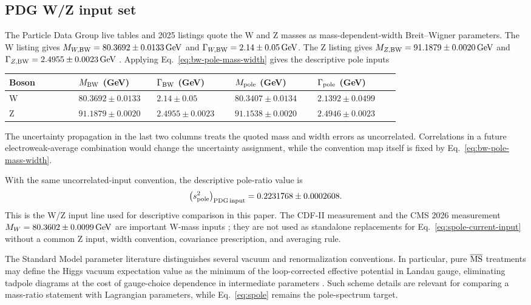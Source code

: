 \subsection{PDG W/Z input set}
\label{sec:current-wz-input}

The Particle Data Group live tables and 2025 listings quote the W and Z masses
as mass-dependent-width Breit--Wigner parameters.  The W listing gives
\(M_{W,\rm BW}=80.3692\pm0.0133\,{\rm GeV}\) and
\(\Gamma_{W,\rm BW}=2.14\pm0.05\,{\rm GeV}\).  The Z listing gives
\(M_{Z,\rm BW}=91.1879\pm0.0020\,{\rm GeV}\) and
\(\Gamma_{Z,\rm BW}=2.4955\pm0.0023\,{\rm GeV}\)
\cite{PDGWListing2025,PDGZListing2025}.  Applying
Eq.~\eqref{eq:bw-pole-mass-width} gives the descriptive pole inputs
\begin{center}
\small
\begin{tabular}{p{0.16\linewidth}p{0.18\linewidth}p{0.18\linewidth}p{0.19\linewidth}p{0.19\linewidth}}
\toprule
Boson & \(M_{\rm BW}\) (GeV) & \(\Gamma_{\rm BW}\) (GeV) &
\(M_{\rm pole}\) (GeV) & \(\Gamma_{\rm pole}\) (GeV)\\
\midrule
W & \(80.3692\pm0.0133\) & \(2.14\pm0.05\) &
\(80.3407\pm0.0134\) & \(2.1392\pm0.0499\)\\
Z & \(91.1879\pm0.0020\) & \(2.4955\pm0.0023\) &
\(91.1538\pm0.0020\) & \(2.4946\pm0.0023\)\\
\bottomrule
\end{tabular}
\end{center}
The uncertainty propagation in the last two columns treats the quoted mass and
width errors as uncorrelated.  Correlations in a future electroweak-average
combination would change the uncertainty assignment, while the convention map
itself is fixed by Eq.~\eqref{eq:bw-pole-mass-width}.

With the same uncorrelated-input convention, the descriptive pole-ratio value is
\begin{equation}
  \left(s^2_{\rm pole}\right)_{\rm PDG\,input}
  =
  0.2231768\pm0.0002608 .
  \label{eq:spole-current-input}
\end{equation}
This is the W/Z input line used for descriptive comparison in this paper.  The
CDF-II measurement and the CMS 2026 measurement
\(M_W=80.3602\pm0.0099\,{\rm GeV}\) are important W-mass inputs
\cite{CDFII2022,CMSWmass2026}; they are not used as standalone replacements
for Eq.~\eqref{eq:spole-current-input} without a common Z input, width
convention, covariance prescription, and averaging rule.

The Standard Model parameter literature distinguishes several vacuum and renormalization conventions.  In particular, pure \(\overline{\mathrm{MS}}\) treatments may define the Higgs vacuum expectation value as the minimum of the loop-corrected effective potential in Landau gauge, eliminating tadpole diagrams at the cost of gauge-choice dependence in intermediate parameters \cite{MartinRobertson2025}.  Such scheme details are relevant for comparing a mass-ratio statement with Lagrangian parameters, while Eq.~\eqref{eq:spole} remains the pole-spectrum target.

